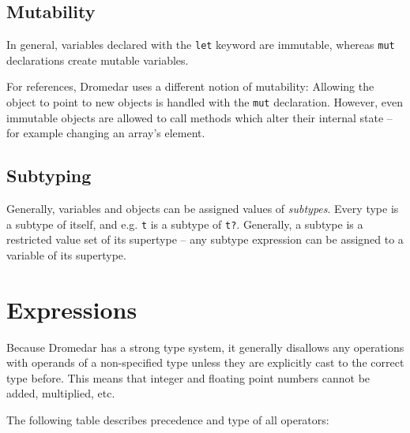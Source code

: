\documentclass{article}
\newcommand{\code}[1]{\lstinline[columns=fixed]{#1}}
\begin{document}
		\subsection{Mutability}
		
			In general, variables declared with the \code{let} keyword are immutable, whereas \code{mut} declarations create mutable variables.
			
			For references, Dromedar uses a different notion of mutability: Allowing the object to point to new objects is handled with the \code{mut} declaration. However, even immutable objects are allowed to call methods which alter their internal state -- for example changing an array's element.
			
		\subsection{Subtyping}
		
			Generally, variables and objects can be assigned values of \textit{subtypes}. Every type is a subtype of itself, and e.g. \code{t} is a subtype of \code{t?}. Generally, a subtype is a restricted value set of its supertype -- any subtype expression can be assigned to a variable of its supertype.
		
	\section{Expressions}
	
		Because Dromedar has a strong type system, it generally disallows any operations with operands of a non-specified type unless they are explicitly cast to the correct type before. This means that integer and floating point numbers cannot be added, multiplied, etc.
		
		The following table describes precedence and type of all operators:\\
		
\end{document}
